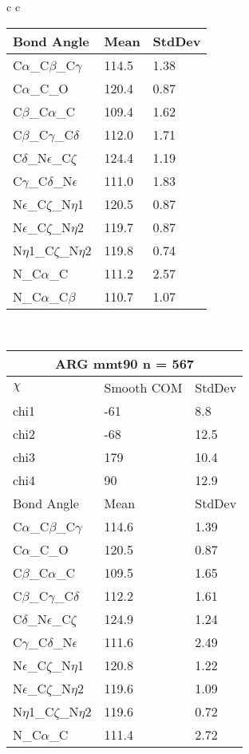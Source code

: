 \begin{longtable}{ c c }
\begin{tabular}{ l l l }
  Bond Angle   & Mean     & StdDev \\ \midrule
  C$\alpha$\_C$\beta$\_C$\gamma$ & 114.5 & 1.38\\
  C$\alpha$\_C\_O & 120.4 & 0.87\\
  C$\beta$\_C$\alpha$\_C & 109.4 & 1.62\\
  C$\beta$\_C$\gamma$\_C$\delta$ & 112.0 & 1.71\\
  C$\delta$\_N$\epsilon$\_C$\zeta$ & 124.4 & 1.19\\
  C$\gamma$\_C$\delta$\_N$\epsilon$ & 111.0 & 1.83\\
  N$\epsilon$\_C$\zeta$\_N$\eta$1 & 120.5 & 0.87\\
  N$\epsilon$\_C$\zeta$\_N$\eta$2 & 119.7 & 0.87\\
  N$\eta$1\_C$\zeta$\_N$\eta$2 & 119.8 & 0.74\\
  N\_C$\alpha$\_C & 111.2 & 2.57\\
  N\_C$\alpha$\_C$\beta$ & 110.7 & 1.07\\
  \bottomrule
  \end{tabular}
  \\
  \begin{tabular}{ l l l }
  \toprule
  \multicolumn{3}{c}{ARG \textbf{mmt90} n = 567} \\ \toprule
  $\chi$       & Smooth COM & StdDev \\ \midrule
  chi1 & -61 & 8.8 \\ 
  chi2 & -68 & 12.5 \\ 
  chi3 & 179 & 10.4 \\ 
  chi4 & 90 & 12.9 \\ \midrule
  Bond Angle   & Mean     & StdDev \\ \midrule
  C$\alpha$\_C$\beta$\_C$\gamma$ & 114.6 & 1.39\\
  C$\alpha$\_C\_O & 120.5 & 0.87\\
  C$\beta$\_C$\alpha$\_C & 109.5 & 1.65\\
  C$\beta$\_C$\gamma$\_C$\delta$ & 112.2 & 1.61\\
  C$\delta$\_N$\epsilon$\_C$\zeta$ & 124.9 & 1.24\\
  C$\gamma$\_C$\delta$\_N$\epsilon$ & 111.6 & 2.49\\
  N$\epsilon$\_C$\zeta$\_N$\eta$1 & 120.8 & 1.22\\
  N$\epsilon$\_C$\zeta$\_N$\eta$2 & 119.6 & 1.09\\
  N$\eta$1\_C$\zeta$\_N$\eta$2 & 119.6 & 0.72\\
  N\_C$\alpha$\_C & 111.4 & 2.72\\

\end{tabular}
\end{longtable}
